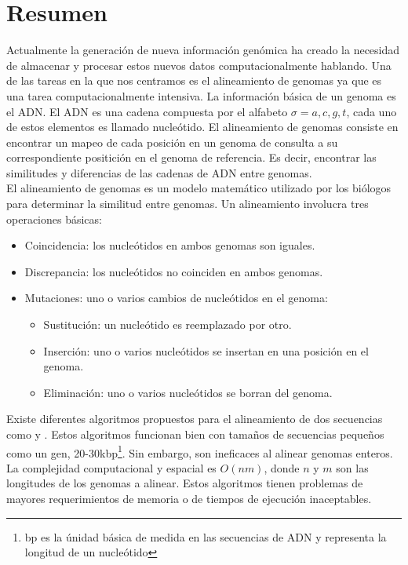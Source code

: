 \documentclass[12pt,a4paper]{article}
\begin{document}
\section{Resumen}
\indent
Actualmente la generación de nueva información genómica ha creado la necesidad de almacenar y procesar estos nuevos datos computacionalmente hablando. Una de las tareas en la que nos centramos es el alineamiento de genomas ya que es una tarea computacionalmente intensiva. La información básica de un genoma es el ADN. El ADN es una cadena compuesta por el alfabeto $\sigma={a,c,g,t}$, cada uno de estos elementos es llamado nucleótido. El alineamiento de genomas consiste en encontrar un mapeo de cada posición en un genoma de consulta a su correspondiente positición en el genoma de referencia. Es decir, encontrar las similitudes y diferencias de las cadenas de ADN entre genomas.\\
El alineamiento de genomas es un modelo matemático utilizado por los biólogos para determinar la similitud entre genomas. Un alineamiento involucra tres operaciones básicas:
\begin{itemize}
  \item Coincidencia: los nucleótidos en ambos genomas son iguales.
  \item Discrepancia: los nucleótidos no coinciden en ambos genomas.
  \item Mutaciones: uno o varios cambios de nucleótidos en el genoma:
    \begin{itemize}
      \item Sustitución: un nucleótido es reemplazado por otro.
      \item Inserción: uno o varios nucleótidos se insertan en una posición en el genoma.
      \item Eliminación: uno o varios nucleótidos se borran del genoma.
    \end{itemize}
\end{itemize}
\indent
Existe diferentes algoritmos propuestos para el alineamiento de dos secuencias como \cite{Needleman1970General} y \cite{Waterman}. Estos algoritmos funcionan bien con tamaños de secuencias pequeños como un gen, 20-30kbp\footnote{bp es la únidad básica de medida en las secuencias de ADN y representa la longitud de un nucleótido}. Sin embargo, son ineficaces al alinear genomas enteros. La complejidad computacional y espacial es $O(nm)$, donde $n$ y $m$ son las longitudes de los genomas a alinear. Estos algoritmos tienen problemas de mayores requerimientos de memoria o de tiempos de ejecución inaceptables.\\
\end{document}

